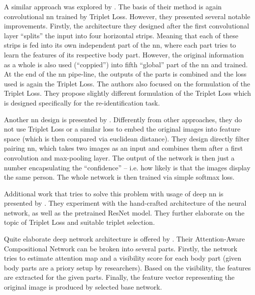 A similar approach was explored by \cite{cheng2016person}. The basis
of their method is again convolutional \gls{nn} trained by Triplet Loss.
However, they presented several notable improvements. Firstly, the architecture
they designed after the first convolutional layer ``splits'' the input into
four horizontal strips. Meaning that each of these strips is fed into its
own independent part of the \gls{nn}, where each part tries to learn the
features of its respective body part. However, the original information as
a whole is also used (``coppied'') into fifth ``global'' part of the \gls{nn}
and trained. At the end of the \gls{nn} pipe-line, the outputs of the parts
is combined and the loss used is again the Triplet Loss. The authors also focused on the
formulation of the Triplet Loss. They propose slightly different formulation
of the Triplet Loss which is designed specifically for the re-identification
task.


Another \gls{nn} design is presented by \cite{li2014deepreid}. Differently from
other approaches, they do not use Triplet Loss or a similar loss to embed the original images into feature
space (which is then compared via euclidean distance). They design directly
filter pairing \gls{nn}, which takes two images as an input and combines them
after a first convolution and max-pooling layer. The output of the network is
then just a number encapsulating the ``confidence'' -- i.e. how likely is that the images
display the same person. The whole network is then trained via simple softmax
loss.

Additional work that tries to solve this problem with usage of deep \gls{nn}
is presented by \cite{hermans2017defense}. They experiment with the
hand-crafted architecture of the neural network, as well as the pretrained
ResNet model. They further elaborate on the topic of Triplet Loss and 
suitable triplet selection.

Quite elaborate deep network architecture is offered by \cite{xu2018attention}.
Their Attention-Aware Compositional Network can be broken into several parts.
Firstly, the network tries to estimate attention map and a visibility score
for each body part (given body parts are a priory setup by researchers). Based
on the visibility, the features are extracted for the given parts.  Finally, the
feature vector representing the original image is produced by selected base
network.

